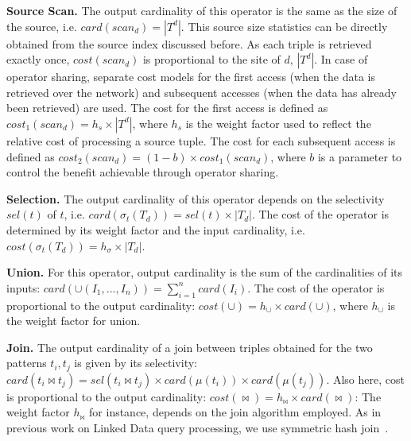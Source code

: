 \textbf{Source Scan.} The output cardinality of this operator is the same as the size of the source, i.e. $card(scan_d) = |T^d|$. 
This source size statistics can be directly obtained from the source index discussed before. As each triple is retrieved exactly once, $cost(scan_d)$ is proportional to the site of $d$, $|T^d|$. 
In case of operator sharing, separate cost
models for the first access (when the data is retrieved over the
network) and subsequent accesses (when the data has already been
retrieved) are used. The cost for the first access is defined as
$cost_1(scan_d) = h_s \times |T^d|$, where $h_s$ is the weight factor
used to reflect the relative cost of processing a source tuple. The cost for each subsequent access is
defined as $cost_2(scan_d) = (1 - b) \times cost_1(scan_d)$, where $b$
is a parameter to control the benefit achievable through operator sharing.

\textbf{Selection.} The output cardinality
of this operator depends on the selectivity $sel(t)$ of $t$, i.e. $card(\sigma_t(T_d)) = sel(t) \times |T_d|$. The cost of the 
operator is determined by its weight factor and the input cardinality, i.e. $cost(\sigma_t(T_d))=h_\sigma \times |T_d|$.

\textbf{Union.} For this operator, output cardinality is the sum of the cardinalities of its inputs:
$card(\cup(I_1,...,I_n)) = \sum_{i=1}^n card(I_i)$. The cost of the
operator is proportional to the output cardinality: $cost(\cup) =
h_\cup \times card(\cup)$, where $h_\cup$ is the weight factor for union. 

\textbf{Join.} The output cardinality of a join between triples obtained for the two patterns $t_i,t_j$ is given by its selectivity: $card(t_i \Join t_j) =
sel(t_i \Join t_j) \times card(\mu(t_i)) \times card(\mu(t_j))$. 
Also here, cost is proportional to the output cardinality: $cost(\Join) =
h_\Join \times card(\Join)$: The weight factor $h_\Join$ for instance, depends on the
join algorithm employed. As in previous work on Linked Data query processing, we use symmetric hash join~\cite{ladwig_linked_2010,sihjoin_2011}. 

